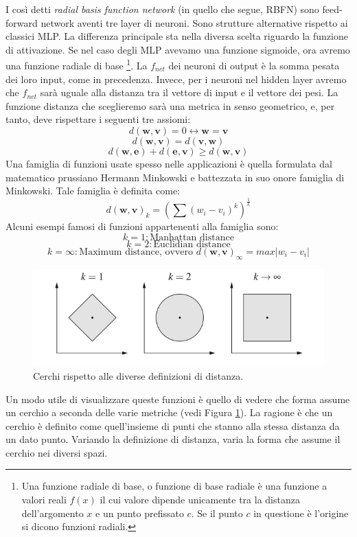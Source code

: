 \documentclass[10pt,a4paper]{article}
\newcommand{\ww}{\mathbf{w}}
\newcommand{\vv}{\mathbf{v}}
\newcommand{\ee}{\mathbf{e}}
\begin{document}
I così detti \emph{radial basis function network} (in quello che segue, RBFN) sono feed-forward network aventi tre layer di neuroni. Sono strutture alternative rispetto ai classici MLP. La differenza principale sta nella diversa scelta riguardo la funzione di attivazione. Se nel caso degli MLP avevamo una funzione sigmoide, ora avremo una funzione radiale di base \footnote{Una funzione radiale di base, o funzione di base radiale è una funzione a valori reali $f(x)$ il cui valore dipende unicamente tra la distanza dell'argomento $x$ e un punto prefissato $c$. Se il punto $c$ in questione è l'origine si dicono funzioni radiali.}. La $f_{net}$ dei neuroni di output è la somma pesata dei loro input, come in precedenza. Invece, per i neuroni nel hidden layer avremo che $f_{net}$ sarà uguale alla distanza tra il vettore di input e il vettore dei pesi. La funzione distanza che sceglieremo sarà una metrica in senso geometrico, e, per tanto, deve rispettare i seguenti tre assiomi:
$$
d(\ww,\vv) = 0 \leftrightarrow \ww = \vv
$$
$$
d(\ww,\vv) = d(\vv,\ww)
$$
$$
d(\ww,\ee) + d(\ee,\vv) \geq d(\ww,\vv)
$$
Una famiglia di funzioni usate spesso nelle applicazioni è quella formulata dal matematico prussiano Hermann Minkowski e battezzata in suo onore famiglia di Minkowski. Tale famiglia è definita come:
$$
d(\ww,\vv)_k = (\sum (w_i - v_i)^k)^{\frac{1}{k}}
$$
Alcuni esempi famosi di funzioni appartenenti alla famiglia sono:
$$
k = 1: \text{Manhattan distance}
$$
$$
k=2:\text{Euclidian distance}
$$
$$
k = \infty: \text{Maximum distance, ovvero } d(\ww,\vv)_\infty = max |w_i - v_i|
$$
\begin{figure}
\centering
\includegraphics[scale=0.4]{img/circle.png}
\caption{Cerchi rispetto alle diverse definizioni di distanza.}
\label{fig:16}
\end{figure}
Un modo utile di visualizzare queste funzioni è quello di vedere che forma assume un cerchio a seconda delle varie metriche (vedi Figura \ref{fig:16}). La ragione è che un cerchio è definito come quell'insieme di punti che stanno alla stessa distanza da un dato punto. Variando la definizione di distanza, varia la forma che assume il cerchio nei diversi spazi.
\end{document}
